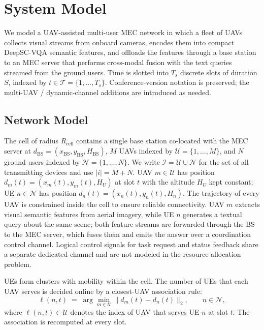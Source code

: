 \section{System Model}\label{sec:system}

We model a UAV-assisted multi-user MEC network in which a fleet of UAVs
collects visual streams from onboard cameras, encodes them into compact
DeepSC-VQA semantic features, and offloads the features through a base
station to an MEC server that performs cross-modal fusion with the
text queries streamed from the ground users. Time is slotted into
$T_s$ discrete slots of duration $S$, indexed by
$t\in\mathcal{T}=\{1,\dots,T_s\}$. Conference-version notation
\cite{xie2022taskoriented,liu2024jamminguav} is preserved; the
multi-UAV / dynamic-channel additions are introduced as needed.

\subsection{Network Model}\label{subsec:network}
The cell of radius $R_{\mathrm{cell}}$ contains a single base station
co-located with the MEC server at $d_{\mathrm{BS}}=(x_{\mathrm{BS}},
y_{\mathrm{BS}}, H_{\mathrm{BS}})$, $M$ UAVs indexed by
$\mathcal{U}=\{1,\dots,M\}$, and $N$ ground users indexed by
$\mathcal{N}=\{1,\dots,N\}$. We write $\mathcal{I}=\mathcal{U}\cup
\mathcal{N}$ for the set of all transmitting devices and use $|i|=M+N$.
UAV $m\in\mathcal{U}$ has position $d_m(t)=(x_m(t),y_m(t),H_U)$ at slot
$t$ with the altitude $H_U$ kept constant; UE $n\in\mathcal{N}$ has
position $d_n(t)=(x_n(t),y_n(t),H_n)$. The trajectory of every UAV is
constrained inside the cell to ensure reliable connectivity. UAV $m$
extracts visual semantic features from aerial imagery, while UE $n$
generates a textual query about the same scene; both feature streams are
forwarded through the BS to the MEC server, which fuses them and emits
the answer over a coordination control channel. Logical control signals
for task request and status feedback share a separate dedicated channel
and are not modeled in the resource allocation problem.

UEs form clusters with mobility within the cell. The number of UEs that
each UAV serves is decided online by a closest-UAV association rule:
\begin{equation}
\ell(n,t) \;=\; \arg\min_{m\in\mathcal{U}} \|d_m(t)-d_n(t)\|_2,
\qquad n\in\mathcal{N},
\label{eq:assoc}
\end{equation}
where $\ell(n,t)\in\mathcal{U}$ denotes the index of UAV that serves UE
$n$ at slot $t$. The association is recomputed at every slot.

